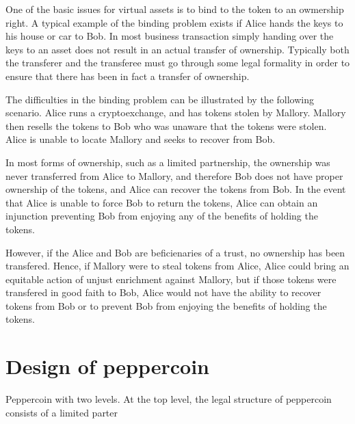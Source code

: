 \documentclass[journal]{IEEEtran}
\begin{document}
One of the basic issues for virtual assets is to bind to the token to
an owmership right.  A typical example of the binding problem exists
if Alice hands the keys to his house or car to Bob.  In most business
transaction simply handing over the keys to an asset does not result
in an actual transfer of ownership.  Typically both the transferer and
the transferee must go through some legal formality in order to ensure
that there has been in fact a transfer of ownership.

The difficulties in the binding problem can be illustrated by the
following scenario.  Alice runs a cryptoexchange, and has tokens
stolen by Mallory.  Mallory then resells the tokens to Bob who was
unaware that the tokens were stolen.  Alice is unable to locate
Mallory and seeks to recover from Bob.

In most forms of ownership, such as a limited partnership, the
ownership was never transferred from Alice to Mallory, and therefore
Bob does not have proper ownership of the tokens, and Alice can
recover the tokens from Bob.  In the event that Alice is unable to
force Bob to return the tokens, Alice can obtain an injunction
preventing Bob from enjoying any of the benefits of holding the
tokens.

However, if the Alice and Bob are beficienaries of a trust, no
ownership has been transfered.  Hence, if Mallory were to steal tokens
from Alice, Alice could bring an equitable action of unjust enrichment
against Mallory, but if those tokens were transfered in good faith to
Bob, Alice would not have the ability to recover tokens from Bob or to
prevent Bob from enjoying the benefits of holding the tokens.


\section{Design of peppercoin}

Peppercoin with two levels.  At the top level, the legal structure of
peppercoin consists of a limited parter
\end{document}
